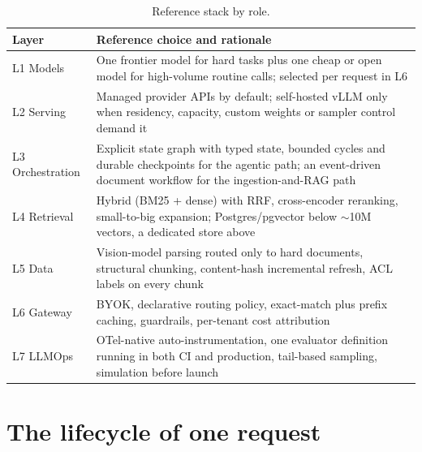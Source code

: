 \documentclass[11pt,twoside,openright]{book}
\theoremstyle{definition}
\theoremstyle{plain}
\theoremstyle{remark}
\begin{document}
\begin{table}[H]
\centering\small
\renewcommand{\arraystretch}{1.35}
\begin{tabularx}{\textwidth}{@{}l X@{}}
\toprule
\textbf{Layer} & \textbf{Reference choice and rationale} \\
\midrule
L1 Models & One frontier model for hard tasks plus one cheap or open model for
  high-volume routine calls; selected per request in L6 \\
L2 Serving & Managed provider APIs by default; self-hosted vLLM only when
  residency, capacity, custom weights or sampler control demand it \\
L3 Orchestration & Explicit state graph with typed state, bounded cycles and
  durable checkpoints for the agentic path; an event-driven document workflow
  for the ingestion-and-RAG path \\
L4 Retrieval & Hybrid (BM25 + dense) with RRF, cross-encoder reranking,
  small-to-big expansion; Postgres/pgvector below $\sim$10M vectors, a dedicated
  store above \\
L5 Data & Vision-model parsing routed only to hard documents, structural
  chunking, content-hash incremental refresh, ACL labels on every chunk \\
L6 Gateway & BYOK, declarative routing policy, exact-match plus prefix caching,
  guardrails, per-tenant cost attribution \\
L7 LLMOps & OTel-native auto-instrumentation, one evaluator definition running in
  both CI and production, tail-based sampling, simulation before launch \\
\bottomrule
\end{tabularx}
\caption{Reference stack by role.}
\end{table}

\section{The lifecycle of one request}
\end{document}
